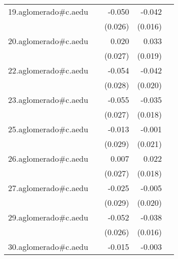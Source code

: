 {\begin{longtable}{l*{4}{D{.}{.}{-1}}}
\addlinespace
19.aglomerado#c.aedu&                     &      -0.050         &      -0.042\sym{**} &                     \\
            &                     &     (0.026)         &     (0.016)         &                     \\
\addlinespace
20.aglomerado#c.aedu&                     &       0.020         &       0.033         &                     \\
            &                     &     (0.027)         &     (0.019)         &                     \\
\addlinespace
22.aglomerado#c.aedu&                     &      -0.054         &      -0.042\sym{*}  &                     \\
            &                     &     (0.028)         &     (0.020)         &                     \\
\addlinespace
23.aglomerado#c.aedu&                     &      -0.055\sym{*}  &      -0.035         &                     \\
            &                     &     (0.027)         &     (0.018)         &                     \\
\addlinespace
25.aglomerado#c.aedu&                     &      -0.013         &      -0.001         &                     \\
            &                     &     (0.029)         &     (0.021)         &                     \\
\addlinespace
26.aglomerado#c.aedu&                     &       0.007         &       0.022         &                     \\
            &                     &     (0.027)         &     (0.018)         &                     \\
\addlinespace
27.aglomerado#c.aedu&                     &      -0.025         &      -0.005         &                     \\
            &                     &     (0.029)         &     (0.020)         &                     \\
\addlinespace
29.aglomerado#c.aedu&                     &      -0.052\sym{*}  &      -0.038\sym{*}  &                     \\
            &                     &     (0.026)         &     (0.016)         &                     \\
\addlinespace
30.aglomerado#c.aedu&                     &      -0.015         &      -0.003         &                     \\

\end{longtable}}
